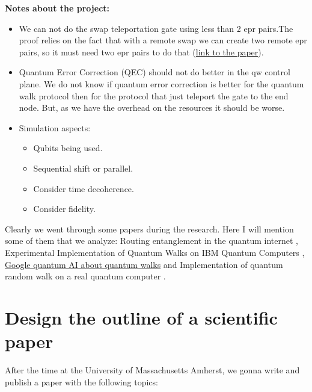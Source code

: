 \documentclass{article}
\begin{document}
        
    \textbf{Notes about the project:}\\
    \begin{itemize}
    
        \item We can not do the swap teleportation gate using less than 2 epr pairs.The proof relies on the fact that with a remote swap we can create two remote epr pairs, so it must need two epr pairs to do that (\hyperlink{https://journals.aps.org/pra/pdf/10.1103/PhysRevA.64.032302}{link to the paper}).\\

        \item Quantum Error Correction (QEC) should not do better in the qw control plane. We do not know if quantum error correction is better for the quantum walk protocol then for the protocol that just teleport the gate to the end node. But, as we have the overhead on the resources it should be worse.\\
        
        \item Simulation aspects:
        \begin{itemize}
            \item Qubits being used.
            \item Sequential shift or parallel.
            \item Consider time decoherence.
            \item Consider fidelity.
        \end{itemize}

    \end{itemize}

    Clearly we went through some papers during the research. Here I will mention some of them that we analyze: Routing entanglement in the quantum internet \cite{routing_entanglement}, Experimental Implementation of Quantum Walks on IBM Quantum Computers \cite{experimental}, \href{https://quantumai.google/cirq/experiments/quantum_walks}{Google quantum AI about quantum walks} and Implementation of quantum random walk on a real quantum computer \cite{implementation}.

\section{Design the outline of a scientific paper}

    After the time at the University of  Massachusetts Amherst, we gonna write and publish a paper with the following topics:
\end{document}
